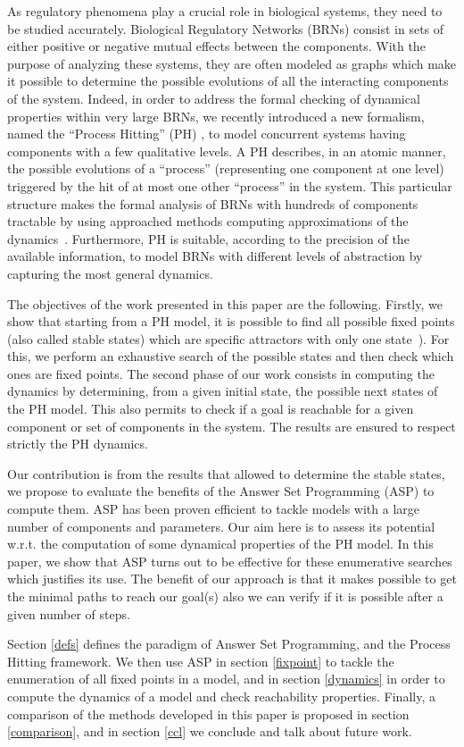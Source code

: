 As regulatory phenomena play a crucial role in biological systems, they need to
be studied accurately. Biological Regulatory Networks (BRNs) consist in sets
of either positive or negative mutual effects between the components. With the
purpose of analyzing these systems, they are often modeled as graphs which make
it possible to determine the possible evolutions of all the interacting components of the system. Indeed, in order to address the formal checking of dynamical properties within very large BRNs, we recently introduced a new formalism, named the “Process Hitting” (PH) \cite{PMR10-TCSB}, to model concurrent systems having components with a few qualitative levels. A PH describes, in an atomic manner, the possible evolutions of a “process” (representing one component at one level) triggered by the hit of at most one other “process” in the system. This particular structure makes the formal analysis of BRNs with hundreds of components tractable by using approached methods computing approximations of the dynamics~\cite{PMR12-MSCS}. Furthermore, PH is suitable, according to the precision of the available information, to model BRNs with different levels of abstraction by capturing the most general dynamics.

The objectives of the work presented in this paper are the following.
Firstly, we show that starting from a PH model, it is possible to find all possible
fixed points (also called stable states)
which are specific attractors with only one state~\cite{wuensche1998genomic}).
For this, we perform an exhaustive search of the possible states and then check which ones are fixed points.
The second phase of our work consists in computing the dynamics by determining, from a given initial state, the possible next states of the PH model.
This also permits to check if a goal is reachable for a given component or set of components in the system.
The results are ensured to respect strictly the PH dynamics.

Our contribution is from the results that allowed to determine the stable states, we propose to evaluate the benefits of the Answer Set Programming (ASP) \cite{baral2003knowledge} to compute them. ASP has been proven efficient to tackle models with a large number of components and parameters. Our aim here is to assess its potential w.r.t. the computation of some dynamical properties of the PH model. In this paper, we show that ASP turns out to be effective for these enumerative searches which justifies its use. The benefit of our approach is that it makes possible to get the minimal paths to reach our goal(s) also we can verify if it is possible after a given number of steps. 

Section \ref{defs} defines the paradigm of Answer Set Programming,
and the Process Hitting framework.
We then use ASP in section \ref{fixpoint} to tackle the enumeration
of all fixed points in a model,
and in section \ref{dynamics} in order to compute the dynamics of a model
and check reachability properties.
Finally, a comparison of the methods developed in this paper is
proposed in section \ref{comparison},
and in section \ref{ccl} we conclude and talk about future work.

